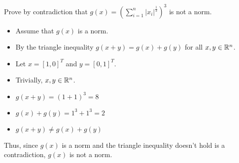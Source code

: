 Prove by contradiction that $g(x) = \left( \sum_{i=1}^n \lvert x_i \lvert^{\frac{1}{3}} \right)^3$ is not a norm.
\begin{itemize}
    \item[] Assume that $g(x)$ is a norm. 
    \item[] By the triangle inequality $g(x + y) = g(x) + g(y)$ for all $x, y \in \mathbb{R}^n$.
    \item[] Let $x = [1, 0]^T$ and $y = [0, 1]^T$. 
    \item[] Trivially, $x, y \in \mathbb{R}^n$.
    \item[] $g(x + y) = (1 + 1)^3 = 8$
    \item[] $g(x) + g(y) = 1^3 + 1^3 = 2$
    \item[] $g(x + y) \neq g(x) + g(y)$
\end{itemize}
Thus, since $g(x)$ is a norm and the triangle inequality doesn't hold is a contradiction, $g(x)$ is not a norm.
